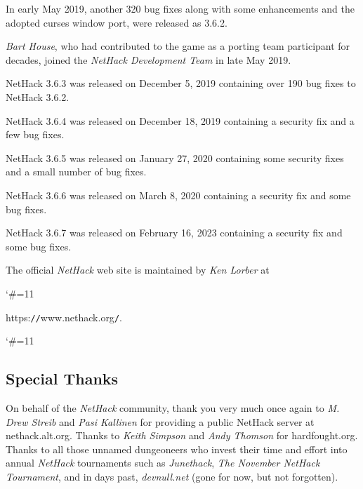 \medskip
In early May 2019, another 320 bug fixes along with some enhancements and
the adopted curses window port, were released as 3.6.2.

\medskip
{\it Bart House}, who had contributed to the game as a porting team participant
for decades, joined the {\it NetHack Development Team} in late May 2019.

\medskip
NetHack 3.6.3 was released on December 5, 2019 containing over 190 bug
fixes to NetHack 3.6.2.

\medskip
NetHack 3.6.4 was released on December 18, 2019 containing a security fix and
a few bug fixes.

\medskip
NetHack 3.6.5 was released on January 27, 2020 containing some security fixes
and a small number of bug fixes.

\medskip
NetHack 3.6.6 was released on March 8, 2020 containing a security fix and
some bug fixes.

\medskip
NetHack 3.6.7 was released on February 16, 2023 containing a security fix and
some bug fixes.

\medskip
\nd The official {\it NetHack\/} web site is maintained by {\it Ken Lorber} at
{\catcode`\#=11
}
https:{\tt /}{\tt /}www.nethack.org{\tt /}.
{\catcode`\#=11
}


\subsection*{Special Thanks}
\nd On behalf of the {\it NetHack\/} community, thank you very much once
again to {\it M. Drew Streib} and {\it Pasi Kallinen} for providing a
public NetHack server at nethack.alt.org. Thanks to {\it Keith Simpson}
and {\it Andy Thomson} for hardfought.org. Thanks to all those
unnamed dungeoneers who invest their time and effort into annual
{\it NetHack\/} tournaments such as {\it Junethack},
{\it The November NetHack Tournament}, and in days past,
{\it devnull.net\/} (gone for now, but not forgotten).
\clearpage


